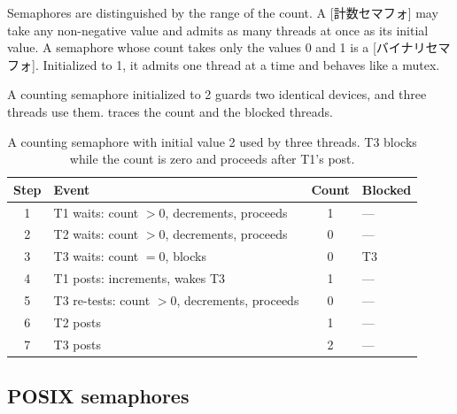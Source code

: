 \documentclass[../main.tex]{subfiles}
\begin{document}
Semaphores are distinguished by the range of the count.  A
[計数セマフォ] may take any non-negative value and
admits as many threads at once as its initial value.  A
semaphore whose count takes only the values 0 and 1 is a
[バイナリセマフォ].  Initialized to 1, it admits
one thread at a time and behaves like a mutex.

\begin{example}
  A counting semaphore initialized to 2 guards two identical devices, and
  three threads use them.   traces the count and
  the blocked threads.
\end{example}

\begin{table}[htbp]
  \centering
  \caption{A counting semaphore with initial value 2 used by three
    threads.  T3 blocks while the count is zero and proceeds after T1's
    post.}
  \label{tab:l10-sem-trace}
  \small
  \begin{tabular}{@{}clcl@{}}
    \toprule
    Step & Event & Count & Blocked \\
    \midrule
    1 & T1 waits: count $>0$, decrements, proceeds & 1 & --- \\
    2 & T2 waits: count $>0$, decrements, proceeds & 0 & --- \\
    3 & T3 waits: count $=0$, blocks               & 0 & T3 \\
    4 & T1 posts: increments, wakes T3             & 1 & --- \\
    5 & T3 re-tests: count $>0$, decrements, proceeds & 0 & --- \\
    6 & T2 posts                                    & 1 & --- \\
    7 & T3 posts                                    & 2 & --- \\
    \bottomrule
  \end{tabular}
\end{table}

\subsection{POSIX semaphores}
\end{document}
